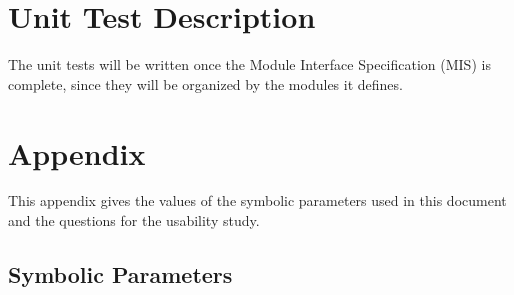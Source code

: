 \documentclass[12pt, titlepage]{article}
\begin{document}
\section{Unit Test Description}

The unit tests will be written once the Module Interface Specification (MIS)
is complete, since they will be organized by the modules it defines.





\newpage

\section{Appendix}

This appendix gives the values of the symbolic parameters used in this
document and the questions for the usability study.

\subsection{Symbolic Parameters}
\end{document}
